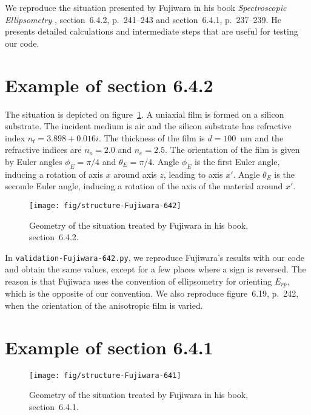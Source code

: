 

We reproduce the situation presented by Fujiwara in his book \emph{Spectroscopic Ellipsometry} \cite{Fujiwara}, section~6.4.2, p.~241--243 and section~6.4.1, p.~237--239.
He presents detailed calculations and intermediate steps that are useful for testing our code.


\section{Example of section 6.4.2}

The situation is depicted on figure~\ref{fig:situation642}.
A uniaxial film is formed on a silicon substrate.
The incident medium is air and the silicon substrate has refractive index $n_t = 3.898 + 0.016i$.
The thickness of the film is $d = 100$~nm and the refractive indices are $n_o = 2.0$ and $n_e=2.5$. 
The orientation of the film is given by Euler angles $\phi_E=\pi/4$ and $\theta_E = \pi/4$.
Angle $\phi_E$ is the first Euler angle, inducing a rotation of axis $x$ around axis $z$, leading to axis $x'$.
Angle $\theta_E$ is the seconde Euler angle, inducing a rotation of the axis of the material around $x'$.

\begin{figure}[b]
\texttt{[image: fig/structure-Fujiwara-642]}
\caption{\label{fig:situation642}Geometry of the situation treated by Fujiwara in his book, section~6.4.2.}
\end{figure}

In \verb/validation-Fujiwara-642.py/, we reproduce Fujiwara's results with our code and obtain the same values, except for a few places where a sign is reversed.
The reason is that Fujiwara uses the convention of ellipsometry for orienting $E_{rp}$, which is the opposite of our convention.
We also reproduce figure~6.19, p.~242, when the orientation of the anisotropic film is varied.

\vspace{10cm}
\mbox{}
\vspace{7cm}

\section{Example of section 6.4.1}

\begin{figure}[b]
\texttt{[image: fig/structure-Fujiwara-641]}
\caption{\label{fig:situation641}Geometry of the situation treated by Fujiwara in his book, section~6.4.1.}
\end{figure}


